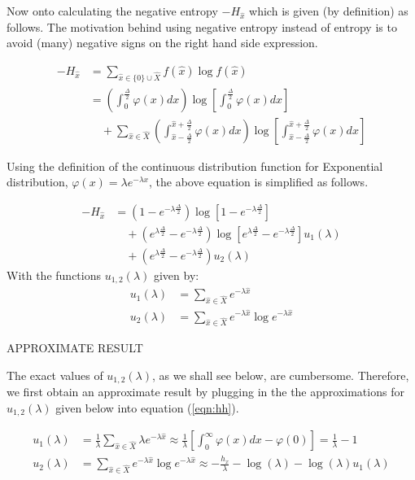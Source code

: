 Now onto calculating the negative entropy $-H_{\hat{x}}$ which is given (by definition) as follows. The motivation behind using negative entropy instead of entropy is to avoid (many) negative signs on the right hand side expression.

\begin{align}-H_{\hat{x}} &= \sum_{\hat{x} \in \{0\} \cup \hat{X}} f(\hat{x}) \log f(\hat{x}) \\ &= \left(\int_{0}^{\frac{\Delta}{2}} \varphi(x) dx \right) \log \left[\int_{0}^{\frac{\Delta}{2}} \varphi(x) dx \right] \nonumber \\ &\quad + \sum_{\hat{x} \in \hat{X}} \left( \int_{\hat{x}-\frac{\Delta}{2}}^{\hat{x}+\frac{\Delta}{2}} \varphi(x) dx \right) \log \left[\int_{\hat{x}-\frac{\Delta}{2}}^{\hat{x}+\frac{\Delta}{2}} \varphi(x) dx \right]\end{align} 

Using the definition of the continuous distribution function for Exponential distribution, $\varphi(x) = \lambda e^{-\lambda x}$, the above equation is simplified as follows.

\begin{align} -H_{\hat{x}} &= \left(1-e^{-\lambda\frac{\Delta}{2}}\right) \log \left[ 1-e^{-\lambda\frac{\Delta}{2}} \right] \nonumber \\ &\quad + \left(e^{\lambda\frac{\Delta}{2}} - e^{-\lambda\frac{\Delta}{2}}\right) \log \left[e^{\lambda\frac{\Delta}{2}} - e^{-\lambda\frac{\Delta}{2}} \right] u_1(\lambda) \nonumber \\ &\quad +  \left(e^{\lambda\frac{\Delta}{2}} - e^{-\lambda\frac{\Delta}{2}}\right) u_2(\lambda) \label{eqn:hh} \end{align}
With the functions $u_{1,2}(\lambda)$ given by:
\begin{align} u_1(\lambda) &= \sum_{\hat{x} \in \hat{X}} e^{-\lambda\hat{x}} \\ u_2(\lambda) &= \sum_{\hat{x} \in \hat{X}} e^{-\lambda\hat{x}} \log e^{-\lambda\hat{x}} \end{align}

APPROXIMATE RESULT

The exact values of $u_{1,2}(\lambda)$, as we shall see below, are cumbersome. Therefore, we first obtain an approximate result by plugging in the the approximations for $u_{1,2}(\lambda)$ given below into equation (\ref{eqn:hh}).

\begin{align} u_1(\lambda) &= \frac{1}{\lambda} \sum_{\hat{x} \in \hat{X}} \lambda e^{-\lambda\hat{x}} \approx   \frac{1}{\lambda} \left[ \int_{0}^{\infty} \varphi(x) dx - \varphi(0) \right] = \frac{1}{\lambda} - 1\\ u_2(\lambda) &= \sum_{\hat{x} \in \hat{X}} e^{-\lambda\hat{x}} \log e^{-\lambda\hat{x}} \approx -\frac{h_x}{\lambda} - \log(\lambda)  - \log(\lambda) u_1(\lambda)\end{align}

